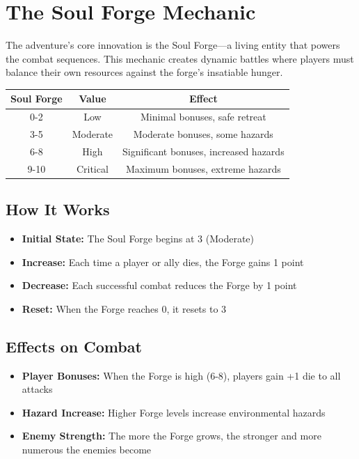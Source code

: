 \documentclass[11pt]{article}
\begin{document}
\section{The Soul Forge Mechanic}

The adventure's core innovation is the Soul Forge---a living entity that powers the combat sequences. This mechanic creates dynamic battles where players must balance their own resources against the forge's insatiable hunger.

\begin{center}
\begin{tabular}{|c|c|c|}
\hline
\textbf{Soul Forge} & \textbf{Value} & \textbf{Effect} \\
\hline
0-2 & Low & Minimal bonuses, safe retreat \\
\hline
3-5 & Moderate & Moderate bonuses, some hazards \\
\hline
6-8 & High & Significant bonuses, increased hazards \\
\hline
9-10 & Critical & Maximum bonuses, extreme hazards \\
\hline
\end{tabular}
\end{center}

\subsection{How It Works}

\begin{itemize}
    \item \textbf{Initial State:} The Soul Forge begins at 3 (Moderate)
    \item \textbf{Increase:} Each time a player or ally dies, the Forge gains 1 point
    \item \textbf{Decrease:} Each successful combat reduces the Forge by 1 point
    \item \textbf{Reset:} When the Forge reaches 0, it resets to 3
\end{itemize}

\subsection{Effects on Combat}

\begin{itemize}
    \item \textbf{Player Bonuses:} When the Forge is high (6-8), players gain +1 die to all attacks
    \item \textbf{Hazard Increase:} Higher Forge levels increase environmental hazards
    \item \textbf{Enemy Strength:} The more the Forge grows, the stronger and more numerous the enemies become
\end{itemize}
\end{document}
